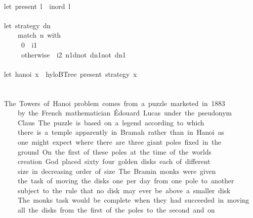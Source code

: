 \documentclass[a4paper]{article}
\begin{document}
\begin{tabbing}
\ttfamily ~\\
\ttfamily ~let~present~l~~inord~l\\
\ttfamily ~\\
\ttfamily ~let~strategy~dn~\\
\ttfamily ~~~~~match~n~with\\
\ttfamily ~~~~~~0~~i1\\
\ttfamily ~~~~~~otherwise~~i2~n1dnot~dn1not~dn1\\
\ttfamily ~~~~~\\
\ttfamily ~let~hanoi~x~~hyloBTree~present~strategy~x\\
\ttfamily ~\\
\ttfamily ~\\
\ttfamily ~The~Towers~of~Hanoi~problem~comes~from~a~puzzle~marketed~in~1883\\
\ttfamily ~~~~~by~the~French~mathematician~Édouard~Lucas~under~the~pseudonym\\
\ttfamily ~~~~~Claus~The~puzzle~is~based~on~a~legend~according~to~which\\
\ttfamily ~~~~~there~is~a~temple~apparently~in~Bramah~rather~than~in~Hanoi~as\\
\ttfamily ~~~~~one~might~expect~where~there~are~three~giant~poles~fixed~in~the\\
\ttfamily ~~~~~ground~On~the~first~of~these~poles~at~the~time~of~the~worlds\\
\ttfamily ~~~~~creation~God~placed~sixty~four~golden~disks~each~of~different\\
\ttfamily ~~~~~size~in~decreasing~order~of~size~The~Bramin~monks~were~given\\
\ttfamily ~~~~~the~task~of~moving~the~disks~one~per~day~from~one~pole~to~another\\
\ttfamily ~~~~~subject~to~the~rule~that~no~disk~may~ever~be~above~a~smaller~disk\\
\ttfamily ~~~~~The~monks~task~would~be~complete~when~they~had~succeeded~in~moving\\
\ttfamily ~~~~~all~the~disks~from~the~first~of~the~poles~to~the~second~and~on\\

\end{tabbing}
\end{document}
